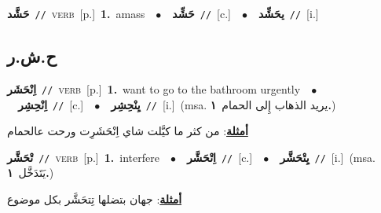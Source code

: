 \documentclass[10pt,a4paper,twoside]{article} %
\begin{document}
\begin{multicols}{2}
{\setlength\topsep{0pt}\textbf{\foreignlanguage{arabic}{حَشَّد}}\ {\color{gray}\texttt{//}\color{black}}\ \textsc{verb}\ [p.]\ \textbf{1.}~amass\ \ $\bullet$\ \ \setlength\topsep{0pt}\textbf{\foreignlanguage{arabic}{حَشِّد}}\ {\color{gray}\texttt{//}\color{black}}\ [c.]\ \ $\bullet$\ \ \setlength\topsep{0pt}\textbf{\foreignlanguage{arabic}{يحَشِّد}}\ {\color{gray}\texttt{//}\color{black}}\ [i.]\ } \vspace{2mm}

\vspace{-3mm}
\subsection*{\color{blue}\foreignlanguage{arabic}{ح.ش.ر}\color{blue}{}} 

{\setlength\topsep{0pt}\textbf{\foreignlanguage{arabic}{اِنْحَشَر}}\ {\color{gray}\texttt{//}\color{black}}\ \textsc{verb}\ [p.]\ \textbf{1.}~want to go to the bathroom urgently\ \ $\bullet$\ \ \setlength\topsep{0pt}\textbf{\foreignlanguage{arabic}{اِنْحِشِر}}\ {\color{gray}\texttt{//}\color{black}}\ [c.]\ \ $\bullet$\ \ \setlength\topsep{0pt}\textbf{\foreignlanguage{arabic}{يِنْحِشِر}}\ {\color{gray}\texttt{//}\color{black}}\ [i.]\ \color{gray}(msa. \foreignlanguage{arabic}{يريد الذهاب إِلى الحمام}~\foreignlanguage{arabic}{\textbf{١.}})\color{black}\  \begin{flushright}\color{gray}\foreignlanguage{arabic}{\textbf{\underline{\foreignlanguage{arabic}{أمثلة}}}: من كثر ما كيَّلت شاي اِنْحَشَرِت ورحت عالحمام}\end{flushright}\color{black}} \vspace{2mm}

{\setlength\topsep{0pt}\textbf{\foreignlanguage{arabic}{تْحَشَّر}}\ {\color{gray}\texttt{//}\color{black}}\ \textsc{verb}\ [p.]\ \textbf{1.}~interfere\ \ $\bullet$\ \ \setlength\topsep{0pt}\textbf{\foreignlanguage{arabic}{اِتْحَشَّر}}\ {\color{gray}\texttt{//}\color{black}}\ [c.]\ \ $\bullet$\ \ \setlength\topsep{0pt}\textbf{\foreignlanguage{arabic}{يِتْحَشَّر}}\ {\color{gray}\texttt{//}\color{black}}\ [i.]\ \color{gray}(msa. \foreignlanguage{arabic}{يَتَدَخَّل}~\foreignlanguage{arabic}{\textbf{١.}})\color{black}\  \begin{flushright}\color{gray}\foreignlanguage{arabic}{\textbf{\underline{\foreignlanguage{arabic}{أمثلة}}}: جهان بتضلها تِتحَشَّر بكل موضوع}\end{flushright}\color{black}} \vspace{2mm}


\end{multicols}
\end{document}
